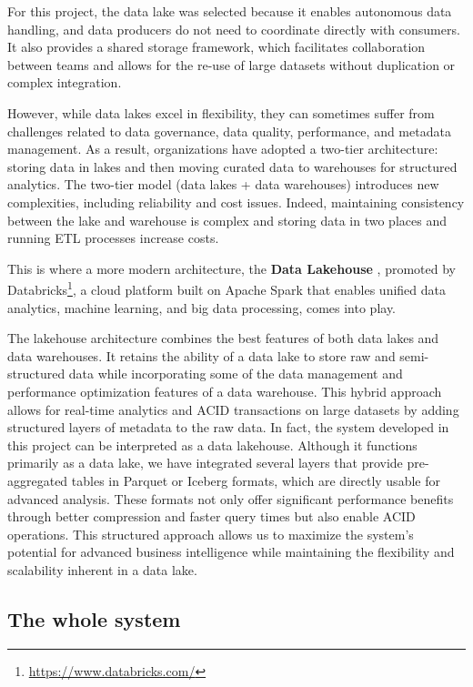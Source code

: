For this project, the data lake was selected because it enables autonomous data handling, and data producers do not need to coordinate directly with consumers. It also provides a shared storage framework, which facilitates collaboration between teams and allows for the re-use of large datasets without duplication or complex integration.

However, while data lakes excel in flexibility, they can sometimes suffer from challenges related to data governance, data quality, performance, and metadata management. As a result, organizations have adopted a two-tier architecture: storing data in lakes and then moving curated data to warehouses for structured analytics.
The two-tier model (data lakes + data warehouses) introduces new complexities, including reliability and cost issues. Indeed, maintaining consistency between the lake and warehouse is complex and storing data in two places and running ETL processes increase costs.

This is where a more modern architecture, the \textbf{Data Lakehouse} \cite{armbrust2021lakehouse}, promoted by Databricks\footnote{\url{https://www.databricks.com/}}, a cloud platform built on Apache Spark that enables unified data analytics, machine learning, and big data processing, comes into play.

The lakehouse architecture combines the best features of both data lakes and data warehouses. It retains the ability of a data lake to store raw and semi-structured data while incorporating some of the data management and performance optimization features of a data warehouse. This hybrid approach allows for real-time analytics and \ac{ACID} transactions on large datasets by adding structured layers of metadata to the raw data.
In fact, the system developed in this project can be interpreted as a data lakehouse. Although it functions primarily as a data lake, we have integrated several layers that provide pre-aggregated tables in Parquet or Iceberg formats, which are directly usable for advanced analysis. These formats not only offer significant performance benefits through better compression and faster query times but also enable \ac{ACID} operations. This structured approach allows us to maximize the system's potential for advanced business intelligence while maintaining the flexibility and scalability inherent in a data lake.

\subsection{The whole system}

